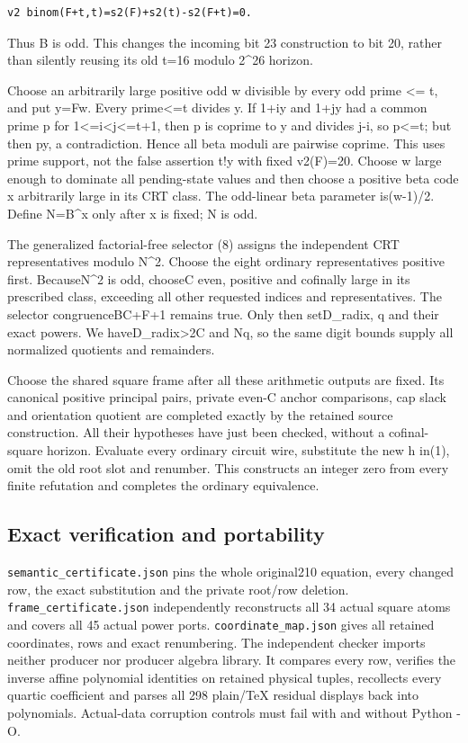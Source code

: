 \begin{verbatim}
v2 binom(F+t,t)=s2(F)+s2(t)-s2(F+t)=0.
\end{verbatim}

Thus B is odd. This changes the incoming bit 23 construction to bit 20,
rather than silently reusing its old t=16 modulo 2\^{}26 horizon.

Choose an arbitrarily large positive odd w divisible by every odd prime
\textless= t, and put y=Fw. Every prime\textless=t divides y. If 1+iy
and 1+jy had a common prime p for 1\textless=i\textless j\textless=t+1,
then p is coprime to y and divides j-i, so p\textless=t; but then
p\textbar y, a contradiction. Hence all beta moduli are pairwise
coprime. This uses prime support, not the false assertion t!\textbar y
with fixed v2(F)=20. Choose w large enough to dominate all pending-state
values and then choose a positive beta code x arbitrarily large in its
CRT class. The odd-linear beta parameter is(w-1)/2. Define N=B\^{}x only
after x is fixed; N is odd.

The generalized factorial-free selector (8) assigns the independent CRT
representatives modulo N\^{}2. Choose the eight ordinary representatives
positive first. BecauseN\^{}2 is odd, chooseC even, positive and
cofinally large in its prescribed class, exceeding all other requested
indices and representatives. The selector congruenceB\textbar C+F+1
remains true. Only then setD\_radix, q and their exact powers. We
haveD\_radix\textgreater2C and N\textbar q, so the same digit bounds
supply all normalized quotients and remainders.

Choose the shared square frame after all these arithmetic outputs are
fixed. Its canonical positive principal pairs, private even-C anchor
comparisons, cap slack and orientation quotient are completed exactly by
the retained source construction. All their hypotheses have just been
checked, without a cofinal-square horizon. Evaluate every ordinary
circuit wire, substitute the new h in(1), omit the old root slot and
renumber. This constructs an integer zero from every finite refutation
and completes the ordinary equivalence.

\subsection{Exact verification and
portability}\label{exact-verification-and-portability}

\nolinkurl{semantic_certificate.json} pins the whole original210 equation,
every changed row, the exact substitution and the private root/row
deletion. \nolinkurl{frame_certificate.json} independently reconstructs
all 34 actual square atoms and covers all 45 actual power ports.
\nolinkurl{coordinate_map.json} gives all retained coordinates, rows and
exact renumbering. The independent checker imports neither producer nor
producer algebra library. It compares every row, verifies the inverse
affine polynomial identities on retained physical tuples, recollects
every quartic coefficient and parses all 298 plain/TeX residual displays
back into polynomials. Actual-data corruption controls must fail with
and without Python -O.

